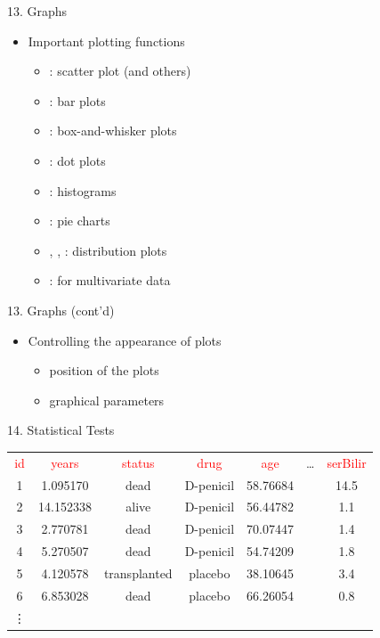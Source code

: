 \documentclass[14pt, aspectratio=169, sectionpage=simple, xclolor=table]{beamer}
\begin{document}
 \begin{frame}[fragile]{13. Graphs}
\begin{itemize}
	\item Important plotting functions
	\begin{itemize}
		\item {}: scatter plot (and others)
		\item {}: bar plots
		\item {}: box-and-whisker plots
		\item {}: dot plots
		\item {}: histograms
		\item {}: pie charts
		\item {}, , :  distribution plots
		\item {}: for multivariate data
	\end{itemize}
\end{itemize}
\end{frame}
  \begin{frame}[fragile]{13. Graphs (cont'd)}
\begin{itemize}
	\item Controlling the appearance of plots
	\begin{itemize}
		\item position of the plots
		\item graphical parameters
	\end{itemize}
\end{itemize}
\end{frame}
\begin{frame}[fragile]{14. Statistical Tests}
\begin{tabular}{ccccccc}
\textcolor{red}{id} &  \textcolor{red}{years} &  \textcolor{red}{status}  &  \textcolor{red}{drug} &  \textcolor{red}{age} & \dots &  \textcolor{red}{serBilir}\\
1& 1.095170& dead&   D-penicil & 58.76684 & & 14.5\\
2& 14.152338& alive&   D-penicil & 56.44782 & & 1.1\\
3& 2.770781& dead& D-penicil & 70.07447 & & 1.4\\
4& 5.270507& dead& D-penicil & 54.74209 & & 1.8\\
5& 4.120578& transplanted&   placebo & 38.10645 & & 3.4\\                                                   
6& 6.853028& dead&   placebo & 66.26054 & & 0.8\\
\vdots &&&&&&
\end{tabular}
\end{frame}
\end{document}
